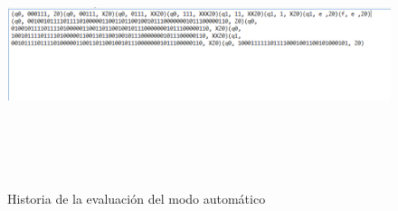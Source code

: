 \begin{figure}[H]
\includegraphics[width=\textwidth, height=7cm]{ArchivoHistoriaPila.png}
\label{fig:autotexto_alfabeto}
\caption{Historia de la evaluaci\'on del modo autom\'atico}
\end{figure}

\newpage

